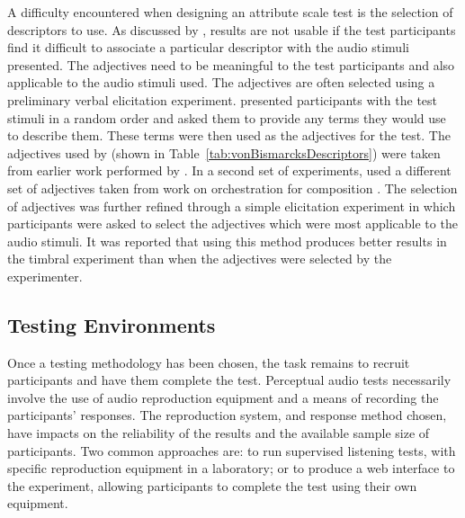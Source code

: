 			A difficulty encountered when designing an attribute scale test is the selection of descriptors to
			use. As discussed by \citet{darke2005assessment}, results are not usable if the test participants
			find it difficult to associate a particular descriptor with the audio stimuli presented. The
			adjectives need to be meaningful to the test participants and also applicable to the audio stimuli
			used. The adjectives are often selected using a preliminary verbal elicitation experiment.
			\citet{namba1991verbal} presented participants with the test stimuli in a random order and asked
			them to provide any terms they would use to describe them. These terms were then used as the
			adjectives for the test. The adjectives used by \citet{kendall1993verbal1} (shown in
			Table~\ref{tab:vonBismarcksDescriptors}) were taken from earlier work performed by
			\citet{vonbismarck1974timbre}. In a second set of experiments, \citet{kendall1993verbal2} used a
			different set of adjectives taken from work on orchestration for composition
			\citep{piston1955orchestration}. The selection of adjectives was further refined through a simple
			elicitation experiment in which participants were asked to select the adjectives which were most
			applicable to the audio stimuli. It was reported that using this method produces better results in
			the timbral experiment than when the adjectives were selected by the experimenter.

	\subsection{Testing Environments}
	\label{sec:Timbre-ListeningTests-Environments}
		Once a testing methodology has been chosen, the task remains to recruit participants and have them complete
		the test. Perceptual audio tests necessarily involve the use of audio reproduction equipment and a means of
		recording the participants' responses. The reproduction system, and response method chosen, have impacts on
		the reliability of the results and the available sample size of participants. Two common approaches are: to
		run supervised listening tests, with specific reproduction equipment in a laboratory; or to produce a web
		interface to the experiment, allowing participants to complete the test using their own equipment.

